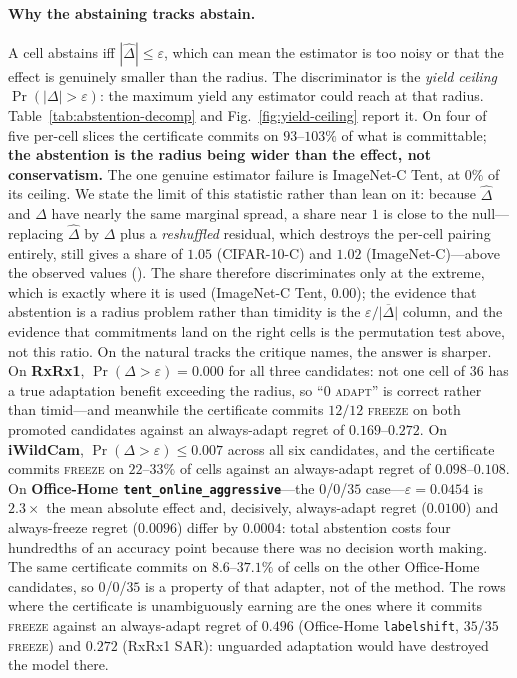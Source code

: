 \paragraph{Why the abstaining tracks abstain.} A cell abstains iff $|\widehat\Delta|\le\varepsilon$,
which can mean the estimator is too noisy or that the effect is genuinely smaller than the radius.
The discriminator is the \emph{yield ceiling} $\Pr(|\Delta|>\varepsilon)$: the maximum yield any
estimator could reach at that radius. Table~\ref{tab:abstention-decomp} and
Fig.~\ref{fig:yield-ceiling} report it. On four of five per-cell slices the certificate commits on
$93$--$103\%$ of what is committable; \textbf{the abstention is the radius being wider than the
effect, not conservatism.} The one genuine estimator failure is ImageNet-C Tent, at $0\%$ of its
ceiling. We state the limit of this statistic rather than lean on it: because $\widehat\Delta$ and
$\Delta$ have nearly the same marginal spread, a share near $1$ is close to the null---replacing
$\widehat\Delta$ by $\Delta$ plus a \emph{reshuffled} residual, which destroys the per-cell pairing
entirely, still gives a share of $1.05$ (CIFAR-10-C) and $1.02$ (ImageNet-C)---above the observed
values (). The share therefore discriminates only at the
extreme, which is exactly where it is used (ImageNet-C Tent, $0.00$); the evidence that abstention
is a radius problem rather than timidity is the $\varepsilon/\overline{|\Delta|}$ column, and the
evidence that commitments land on the right cells is the permutation test above, not this ratio.
On the natural tracks the critique names, the answer is sharper. On \textbf{RxRx1},
$\Pr(\Delta>\varepsilon)=0.000$ for all three candidates: not one cell of $36$ has a true adaptation
benefit exceeding the radius, so ``$0$ \textsc{adapt}'' is correct rather than timid---and meanwhile
the certificate commits $12/12$ \textsc{freeze} on both promoted candidates against an always-adapt
regret of $0.169$--$0.272$. On \textbf{iWildCam}, $\Pr(\Delta>\varepsilon)\le0.007$ across all six
candidates, and the certificate commits \textsc{freeze} on $22$--$33\%$ of cells against an
always-adapt regret of $0.098$--$0.108$. On \textbf{Office-Home
\texttt{tent\_online\_aggressive}}---the $0$/$0$/$35$ case---$\varepsilon=0.0454$ is $2.3\times$ the
mean absolute effect and, decisively, always-adapt regret ($0.0100$) and always-freeze regret
($0.0096$) differ by $0.0004$: total abstention costs four hundredths of an accuracy point because
there was no decision worth making. The same certificate commits on $8.6$--$37.1\%$ of cells on the
other Office-Home candidates, so $0$/$0$/$35$ is a property of that adapter, not of the method. The
rows where the certificate is unambiguously earning are the ones where it commits \textsc{freeze}
against an always-adapt regret of $0.496$ (Office-Home \texttt{labelshift}, $35/35$ \textsc{freeze})
and $0.272$ (RxRx1 SAR): unguarded adaptation would have destroyed the model there.

